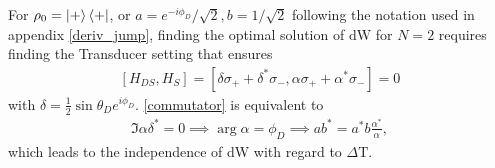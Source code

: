 For $\rho_0 = \ket{+} \bra{+}$, or $a = e^{-i \phi_D}/\sqrt{2}, b = 1/\sqrt{2}$ following the notation used in appendix \ref{deriv_jump}, finding the optimal solution of $\mathrm{dW}$ for $N = 2$ requires finding the Transducer setting that ensures
\begin{align}\label{commutator}
	[H_{DS}, H_S] = [\delta \sigma_{+} + \delta^* \sigma_{-}, \alpha \sigma_{+} + \alpha^* \sigma_{-}] = 0
\end{align}
with $\delta = \frac{1}{2} \sin{\theta_D} e^{i \phi_D}$.
\ref{commutator} is equivalent to
\begin{align*}
	\Im{\alpha \delta^*} = 0 \implies \arg{\alpha} = \phi_D \implies a b^* = a^* b \frac{\alpha^*}{\alpha},
\end{align*}
which leads to the independence of dW with regard to $\Delta \mathrm{T}$. 